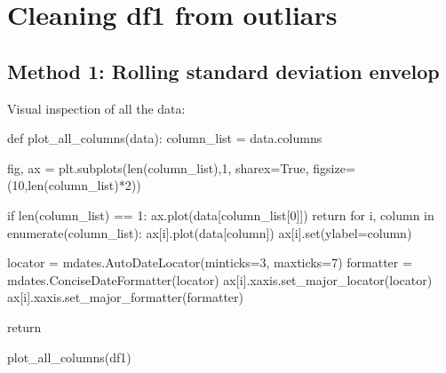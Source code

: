 \documentclass[
  letterpaper,
  DIV=11,
  numbers=noendperiod,
  oneside]{scrreprt}
\newenvironment{Shaded}{\begin{snugshade}}{\end{snugshade}}
\newcommand{\BuiltInTok}[1]{\textcolor[rgb]{0.00,0.23,0.31}{#1}}
\newcommand{\ControlFlowTok}[1]{\textcolor[rgb]{0.00,0.23,0.31}{#1}}
\newcommand{\DecValTok}[1]{\textcolor[rgb]{0.68,0.00,0.00}{#1}}
\newcommand{\KeywordTok}[1]{\textcolor[rgb]{0.00,0.23,0.31}{#1}}
\newcommand{\NormalTok}[1]{\textcolor[rgb]{0.00,0.23,0.31}{#1}}
\newcommand{\OperatorTok}[1]{\textcolor[rgb]{0.37,0.37,0.37}{#1}}
\newcommand{\VariableTok}[1]{\textcolor[rgb]{0.07,0.07,0.07}{#1}}
\begin{document}
\hypertarget{cleaning-df1-from-outliars}{%
\chapter{Cleaning df1 from outliars}\label{cleaning-df1-from-outliars}}

\hypertarget{method-1-rolling-standard-deviation-envelop}{%
\section{Method 1: Rolling standard deviation
envelop}\label{method-1-rolling-standard-deviation-envelop}}

Visual inspection of all the data:

\begin{Shaded}
\begin{Highlighting}[]
\KeywordTok{def}\NormalTok{ plot\_all\_columns(data):}
\NormalTok{    column\_list }\OperatorTok{=}\NormalTok{ data.columns}
    
\NormalTok{    fig, ax }\OperatorTok{=}\NormalTok{ plt.subplots(}\BuiltInTok{len}\NormalTok{(column\_list),}\DecValTok{1}\NormalTok{, sharex}\OperatorTok{=}\VariableTok{True}\NormalTok{, figsize}\OperatorTok{=}\NormalTok{(}\DecValTok{10}\NormalTok{,}\BuiltInTok{len}\NormalTok{(column\_list)}\OperatorTok{*}\DecValTok{2}\NormalTok{))}

    \ControlFlowTok{if} \BuiltInTok{len}\NormalTok{(column\_list) }\OperatorTok{==} \DecValTok{1}\NormalTok{:}
\NormalTok{        ax.plot(data[column\_list[}\DecValTok{0}\NormalTok{]])}
        \ControlFlowTok{return}
    \ControlFlowTok{for}\NormalTok{ i, column }\KeywordTok{in} \BuiltInTok{enumerate}\NormalTok{(column\_list):}
\NormalTok{        ax[i].plot(data[column])}
\NormalTok{        ax[i].}\BuiltInTok{set}\NormalTok{(ylabel}\OperatorTok{=}\NormalTok{column)}
    
\NormalTok{    locator }\OperatorTok{=}\NormalTok{ mdates.AutoDateLocator(minticks}\OperatorTok{=}\DecValTok{3}\NormalTok{, maxticks}\OperatorTok{=}\DecValTok{7}\NormalTok{)}
\NormalTok{    formatter }\OperatorTok{=}\NormalTok{ mdates.ConciseDateFormatter(locator)}
\NormalTok{    ax[i].xaxis.set\_major\_locator(locator)}
\NormalTok{    ax[i].xaxis.set\_major\_formatter(formatter)}

    \ControlFlowTok{return}
\end{Highlighting}
\end{Shaded}

\begin{Shaded}
\begin{Highlighting}[]
\NormalTok{plot\_all\_columns(df1)}
\end{Highlighting}
\end{Shaded}
\end{document}
